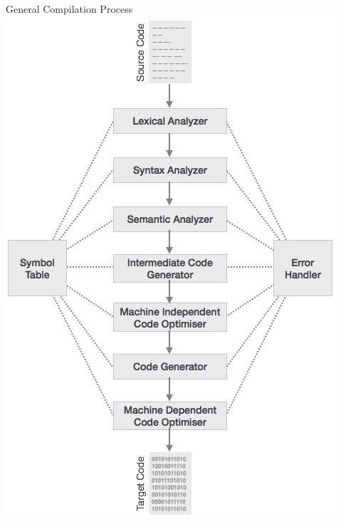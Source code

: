 \documentclass{beamer}
\begin{document}
\begin{frame}{General Compilation Process}
    \centering
    \includegraphics[scale=0.325]{images/low_level_compilation.jpg}
\end{frame}
\end{document}
